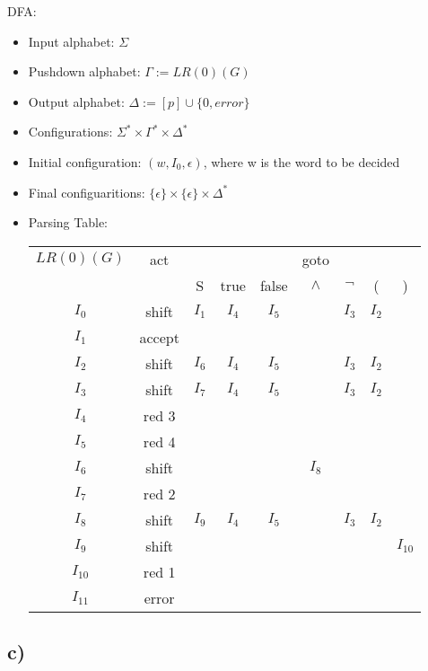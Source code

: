 DFA:
\begin{itemize}
\item Input alphabet: $\Sigma$
\item Pushdown alphabet: $\Gamma := LR(0)(G)$
\item Output alphabet: $\Delta := [p] \cup \{ 0, error\}$
\item Configurations: $\Sigma^* \times \Gamma^* \times \Delta^*$
\item Initial configuration: $(w, I_0, \epsilon)$, where w is the word to be decided
\item Final configuaritions: $\{\epsilon\} \times \{\epsilon\} \times \Delta^*$

\item Parsing Table:
\begin{tabular}{ | c | c | c c c c c c c | }
\hline
$LR(0)(G)$ 	& act 	&		&		&		& goto	&		&		&		\\
			&		& S		& true	& false	&$\land$&$\neg$ & (		& )		\\
\hline
$I_0$		& shift & $I_1$ & $I_4$ & $I_5$ &		& $I_3$ & $I_2$ &		\\
$I_1$		& accept&		&		&		&		&		&		&		\\
$I_2$		& shift & $I_6$ & $I_4$ & $I_5$ &		& $I_3$ & $I_2$ &		\\
$I_3$		& shift & $I_7$ & $I_4$ & $I_5$ &		& $I_3$ & $I_2$ &		\\
$I_4$		& red 3 &		&		&		&		&		&		&		\\
$I_5$		& red 4 &		&		&		&		&		&		&		\\
$I_6$		& shift & 		&		&		& $I_8$ &		&		&		\\
$I_7$		& red 2 &		&		&		&		&		&		&		\\
$I_8$		& shift & $I_9$ & $I_4$ & $I_5$ &		& $I_3$ & $I_2$ &		\\
$I_9$		& shift &		&		&		&		&		&		& $I_{10}$\\
$I_{10}$	& red 1 &		&		&		&		&		&		&		\\
$I_{11}$	& error &		&		&		&		&		&		&		\\
\hline
\end{tabular}
\end{itemize}

\subsection*{c)}

